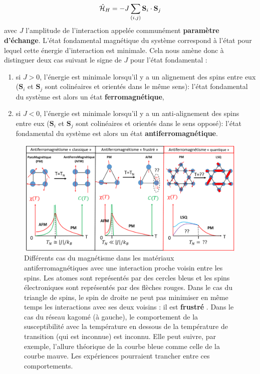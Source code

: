 \begin{equation}
\hat{\mathcal{H}}_H = -J\sum_{(i,j)}\mathbf{S}_i\cdot \mathbf{S}_{j}
\end{equation}
avec $J$ l'amplitude de l'interaction appelée communément \textbf{paramètre d'échange}. L'état fondamental magnétique du système correspond à l'état pour lequel cette énergie d'interaction est minimale. Cela nous amène donc à distinguer deux cas suivant le signe de $J$ pour l'état fondamental :
\begin{enumerate}
\item si $J>0$, l'énergie est minimale lorsqu'il y a un alignement des spins entre eux ($\mathbf{S}_i$ et $\mathbf{S}_j$ sont colinéaires et orientés dans le même sens): l'état fondamental du système est alors un état \textbf{ferromagnétique},
\item si $J<0$, l'énergie est minimale lorsqu'il y a un anti-alignement des spins entre eux ($\mathbf{S}_i$ et $\mathbf{S}_j$ sont colinéaires et orientés dans le sens opposé): l'état fondamental du système est alors un état \textbf{antiferromagnétique}.
\end{enumerate}

\begin{figure}[!ht]
\centering
\includegraphics[scale=0.45]{Fig2.png}\caption{\label{fig:magnetisme}Différents cas du magnétisme dans les matériaux antiferromagnétiques avec une interaction proche voisin entre les spins. Les atomes sont représentés par des cercles bleus et les spins électroniques sont représentés par des flèches rouges. Dans le cas du triangle de spins, le spin de droite ne peut pas minimiser en même temps les interactions avec ses deux voisins : il est \og \textbf{frustré} \fg . Dans le cas du réseau kagomé (à gauche), le comportement de la susceptibilité avec la température en dessous de la température de transition (qui est inconnue) est inconnu. Elle peut suivre, par exemple, l'allure théorique de la courbe bleue comme celle de la courbe mauve. Les expériences pourraient trancher entre ces comportements.}
\end{figure}

